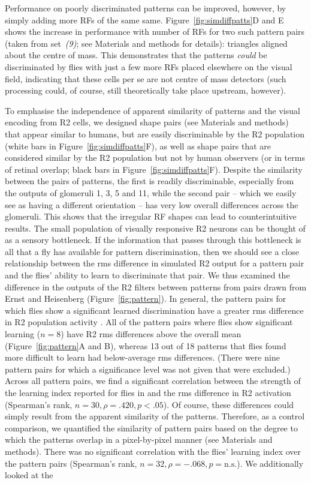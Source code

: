Performance on poorly discriminated patterns can be improved, however, by simply adding more RFs of the same same. Figure~\ref{fig:simdiffpatts}D and E shows the increase in performance with number of RFs for two such pattern pairs (taken from set~\emph{(9)}; see Materials and methods for details): triangles aligned about the centre of mass. This demonstrates that the patterns \emph{could} be discriminated by flies with just a few more RFs placed elsewhere on the visual field, indicating that these cells per se are not centre of mass detectors (such processing could, of course, still theoretically take place upstream, however). 

To emphasise the independence of apparent similarity of patterns and the visual encoding from R2 cells, we designed shape pairs (see Materials and methods) that appear similar to humans, but are easily discriminable by the R2 population (white bars in Figure~\ref{fig:simdiffpatts}F), as well as shape pairs that are considered similar by the R2 population but not by human observers (or in terms of retinal overlap; black bars in Figure~\ref{fig:simdiffpatts}F). Despite the similarity between the pairs of patterns, the first is readily discriminable, especially from the outputs of glomeruli 1, 3, 5 and 11, while the second pair – which we easily see as having a different orientation – has very low overall differences across the glomeruli. This shows that the irregular \ac{RF} shapes can lead to counterintuitive results. The small population of visually responsive R2 neurons can be thought of as a sensory bottleneck. If the information that passes through this bottleneck is all that a fly has available for pattern discrimination, then we should see a close relationship between the \ac{rms} difference in simulated R2 output for a pattern pair and the flies’ ability to learn to discriminate that pair. We thus examined the difference in the outputs of the R2 filters between patterns from pairs drawn from Ernst and Heisenberg \cite{Ernst1999} (Figure~\ref{fig:pattern}). In general, the pattern pairs for which flies show a significant learned discrimination have a greater \ac{rms} difference in R2 population activity \cite{Ernst1999}. All of the pattern pairs where flies show significant learning ($n = 8$) have R2 \ac{rms} differences above the overall mean (Figure~\ref{fig:pattern}A and B), whereas 13 out of 18 patterns that flies found more difficult to learn had below-average \ac{rms} differences. (There were nine pattern pairs for which a significance level was not given that were excluded.) Across all pattern pairs, we find a significant correlation between the strength of the learning index reported for flies in \cite{Ernst1999} and the \ac{rms} difference in R2 activation (Spearman’s rank, $n = 30, \rho = .420, p < .05$). Of course, these differences could simply result from the apparent similarity of the patterns. Therefore, as a control comparison, we quantified the similarity of pattern pairs based on the degree to which the patterns overlap in a pixel-by-pixel manner (see Materials and methods). There was no significant correlation with the flies’ learning index over the pattern pairs (Spearman’s rank, $n = 32, \rho = -.068, p = \mathrm{n.s.}$). We additionally looked at the 